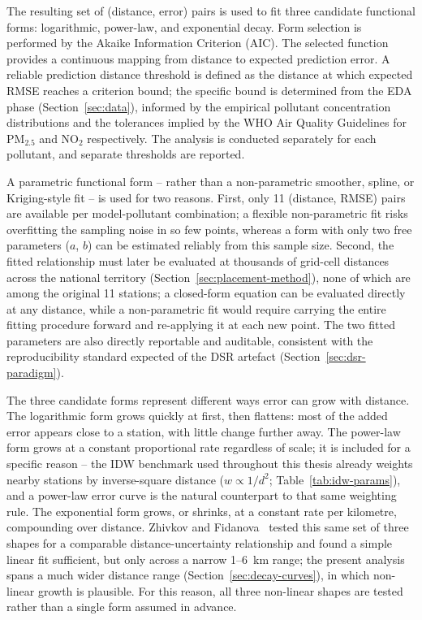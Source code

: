 \documentclass[11pt,a4paper]{article}
\begin{document}
The resulting set of (distance, error) pairs is used to fit three candidate functional forms: logarithmic, power-law, and exponential decay. Form selection is performed by the Akaike Information Criterion (AIC). The selected function provides a continuous mapping from distance to expected prediction error. A reliable prediction distance threshold is defined as the distance at which expected RMSE reaches a criterion bound; the specific bound is determined from the EDA phase (Section~\ref{sec:data}), informed by the empirical pollutant concentration distributions and the tolerances implied by the WHO Air Quality Guidelines for PM$_{2.5}$ and NO$_2$ respectively. The analysis is conducted separately for each pollutant, and separate thresholds are reported.

A parametric functional form -- rather than a non-parametric smoother, spline, or Kriging-style fit -- is used for two reasons. First, only 11 (distance, RMSE) pairs are available per model-pollutant combination; a flexible non-parametric fit risks overfitting the sampling noise in so few points, whereas a form with only two free parameters ($a$, $b$) can be estimated reliably from this sample size. Second, the fitted relationship must later be evaluated at thousands of grid-cell distances across the national territory (Section~\ref{sec:placement-method}), none of which are among the original 11 stations; a closed-form equation can be evaluated directly at any distance, while a non-parametric fit would require carrying the entire fitting procedure forward and re-applying it at each new point. The two fitted parameters are also directly reportable and auditable, consistent with the reproducibility standard expected of the DSR artefact (Section~\ref{sec:dsr-paradigm}).

The three candidate forms represent different ways error can grow with distance. The logarithmic form grows quickly at first, then flattens: most of the added error appears close to a station, with little change further away. The power-law form grows at a constant proportional rate regardless of scale; it is included for a specific reason -- the IDW benchmark used throughout this thesis already weights nearby stations by inverse-square distance ($w \propto 1/d^2$; Table~\ref{tab:idw-params}), and a power-law error curve is the natural counterpart to that same weighting rule. The exponential form grows, or shrinks, at a constant rate per kilometre, compounding over distance. Zhivkov and Fidanova~\cite{zhivkov_fidanova_2026} tested this same set of three shapes for a comparable distance-uncertainty relationship and found a simple linear fit sufficient, but only across a narrow 1--6~km range; the present analysis spans a much wider distance range (Section~\ref{sec:decay-curves}), in which non-linear growth is plausible. For this reason, all three non-linear shapes are tested rather than a single form assumed in advance.
\end{document}
